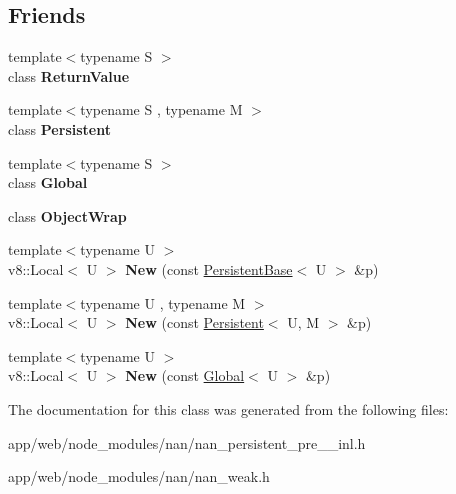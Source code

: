 \subsection*{Friends}
\begin{DoxyCompactItemize}
\item 
\mbox{\label{class_persistent_base_a53f604d3d6f2dc0647df33c9979f116a}} 
{\footnotesize template$<$typename S $>$ }\\class {\bfseries Return\+Value}
\item 
\mbox{\label{class_persistent_base_ad845ec8872174be0a9ca9a3dd1898d30}} 
{\footnotesize template$<$typename S , typename M $>$ }\\class {\bfseries Persistent}
\item 
\mbox{\label{class_persistent_base_adc49d0fc7441cf7e3b5f039334e44243}} 
{\footnotesize template$<$typename S $>$ }\\class {\bfseries Global}
\item 
\mbox{\label{class_persistent_base_aa768a749e991f292d109b060d1c74f75}} 
class {\bfseries Object\+Wrap}
\item 
\mbox{\label{class_persistent_base_a871dabd1b6ac9eb7dcffa832c3310aec}} 
{\footnotesize template$<$typename U $>$ }\\v8\+::\+Local$<$ U $>$ {\bfseries New} (const \hyperlink{class_persistent_base}{Persistent\+Base}$<$ U $>$ \&p)
\item 
\mbox{\label{class_persistent_base_aeffcba0d3279a5385f16e575a0eac558}} 
{\footnotesize template$<$typename U , typename M $>$ }\\v8\+::\+Local$<$ U $>$ {\bfseries New} (const \hyperlink{class_persistent}{Persistent}$<$ U, M $>$ \&p)
\item 
\mbox{\label{class_persistent_base_a2843d3677825f486a341bf8ef4f91771}} 
{\footnotesize template$<$typename U $>$ }\\v8\+::\+Local$<$ U $>$ {\bfseries New} (const \hyperlink{class_global}{Global}$<$ U $>$ \&p)
\end{DoxyCompactItemize}


The documentation for this class was generated from the following files\+:\begin{DoxyCompactItemize}
\item 
app/web/node\+\_\+modules/nan/nan\+\_\+persistent\+\_\+pre\+\_\+\_\+inl.\+h\item 
app/web/node\+\_\+modules/nan/nan\+\_\+weak.\+h\end{DoxyCompactItemize}
